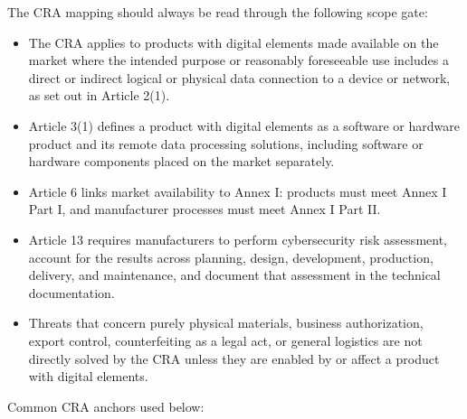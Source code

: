 \documentclass[10pt,a4paper,oneside]{report}
\begin{document}
The CRA mapping should always be read through the following scope gate:

\begin{itemize}
\item The CRA applies to products with digital elements made available on the market where the intended purpose or reasonably foreseeable use includes a direct or indirect logical or physical data connection to a device or network, as set out in Article 2(1).
\item Article 3(1) defines a product with digital elements as a software or hardware product and its remote data processing solutions, including software or hardware components placed on the market separately.
\item Article 6 links market availability to Annex I: products must meet Annex I Part I, and manufacturer processes must meet Annex I Part II.
\item Article 13 requires manufacturers to perform cybersecurity risk assessment, account for the results across planning, design, development, production, delivery, and maintenance, and document that assessment in the technical documentation.
\item Threats that concern purely physical materials, business authorization, export control, counterfeiting as a legal act, or general logistics are not directly solved by the CRA unless they are enabled by or affect a product with digital elements.
\end{itemize}

Common CRA anchors used below:
\end{document}
